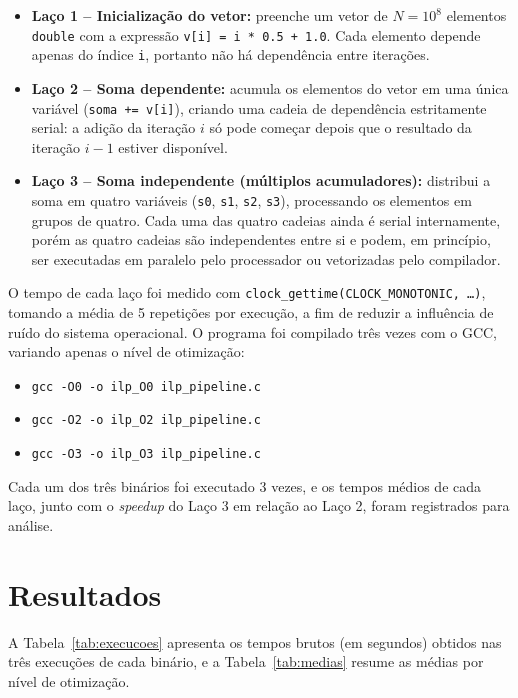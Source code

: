 \documentclass[a4paper,12pt]{article}
\begin{document}
\begin{itemize}
    \item \textbf{Laço 1 -- Inicialização do vetor:} preenche um vetor de $N = 10^8$ elementos \texttt{double} com a expressão \texttt{v[i] = i * 0.5 + 1.0}. Cada elemento depende apenas do índice \texttt{i}, portanto não há dependência entre iterações.
    \item \textbf{Laço 2 -- Soma dependente:} acumula os elementos do vetor em uma única variável (\texttt{soma += v[i]}), criando uma cadeia de dependência estritamente serial: a adição da iteração $i$ só pode começar depois que o resultado da iteração $i-1$ estiver disponível.
    \item \textbf{Laço 3 -- Soma independente (múltiplos acumuladores):} distribui a soma em quatro variáveis (\texttt{s0}, \texttt{s1}, \texttt{s2}, \texttt{s3}), processando os elementos em grupos de quatro. Cada uma das quatro cadeias ainda é serial internamente, porém as quatro cadeias são independentes entre si e podem, em princípio, ser executadas em paralelo pelo processador ou vetorizadas pelo compilador.
\end{itemize}

O tempo de cada laço foi medido com \texttt{clock\_gettime(CLOCK\_MONOTONIC, \ldots)}, tomando a média de 5 repetições por execução, a fim de reduzir a influência de ruído do sistema operacional. O programa foi compilado três vezes com o GCC, variando apenas o nível de otimização:

\begin{itemize}
    \item \texttt{gcc -O0 -o ilp\_O0 ilp\_pipeline.c}
    \item \texttt{gcc -O2 -o ilp\_O2 ilp\_pipeline.c}
    \item \texttt{gcc -O3 -o ilp\_O3 ilp\_pipeline.c}
\end{itemize}

Cada um dos três binários foi executado 3 vezes, e os tempos médios de cada laço, junto com o \textit{speedup} do Laço 3 em relação ao Laço 2, foram registrados para análise.

\section{Resultados}

A Tabela~\ref{tab:execucoes} apresenta os tempos brutos (em segundos) obtidos nas três execuções de cada binário, e a Tabela~\ref{tab:medias} resume as médias por nível de otimização.
\end{document}
